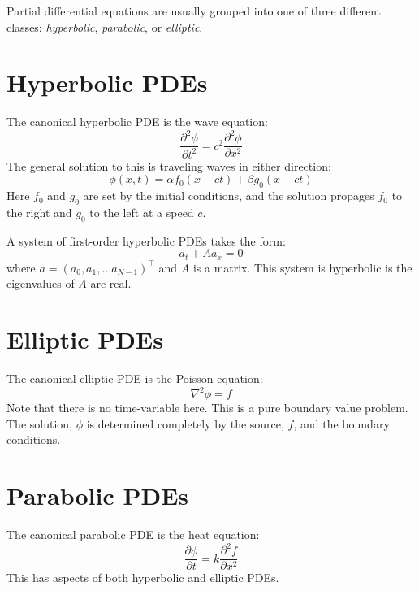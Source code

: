 Partial differential equations are usually grouped into one of 
three different classes: {\em hyperbolic}, {\em parabolic}, 
or {\em elliptic}.


\section{Hyperbolic PDEs}

The canonical hyperbolic PDE is the wave equation:
\begin{equation}
  \frac{\partial^2 \phi}{\partial t^2} = c^2 \frac{\partial^2 \phi}{\partial x^2}
\end{equation}   
The general solution to this is traveling waves in either direction:
\begin{equation}
  \phi(x,t) = \alpha f_0(x - ct) + \beta g_0(x + ct)
\end{equation}
Here $f_0$ and $g_0$ are set by the initial
conditions, and the solution propages $f_0$ to the right and $g_0$ to
the left at a speed $c$.

A system of first-order hyperbolic PDEs takes the form:
\begin{equation}
a_t + A a_x = 0
\end{equation}
where $a = (a_0, a_1, \ldots a_{N-1})^\intercal$ and $A$ is a matrix.
This system is hyperbolic is the eigenvalues of $A$ are real.


\section{Elliptic PDEs}

The canonical elliptic PDE is the Poisson equation:
\begin{equation}
  \nabla^2 \phi = f
\end{equation}
Note that there is no time-variable here.  This is a pure boundary
value problem.  The solution, $\phi$ is determined completely by the
source, $f$, and the boundary conditions.


\section{Parabolic PDEs}

The canonical parabolic PDE is the heat equation:
\begin{equation}
  \frac{\partial \phi}{\partial t} = k \frac{\partial^2 f}{\partial x^2}
\end{equation}
This has aspects of both hyperbolic and elliptic PDEs.



